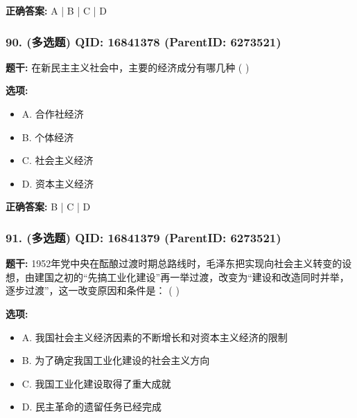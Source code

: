 \documentclass[12pt,UTF8]{ctexart}
\begin{document}
\textbf{正确答案:}
A | B | C | D

\vspace{0.3em}\hrulefill\vspace{0.7em}

\subsubsection*{90. (多选题) \small QID: 16841378 (ParentID: 6273521)}

\textbf{题干:}
在新民主主义社会中，主要的经济成分有哪几种 ( )



\textbf{选项:}
\begin{itemize}[leftmargin=*]

  \item A. 合作社经济

  \item B. 个体经济

  \item C. 社会主义经济

  \item D. 资本主义经济

\end{itemize}

\textbf{正确答案:}
B | C | D

\vspace{0.3em}\hrulefill\vspace{0.7em}

\subsubsection*{91. (多选题) \small QID: 16841379 (ParentID: 6273521)}

\textbf{题干:}
1952年党中央在酝酿过渡时期总路线时，毛泽东把实现向社会主义转变的设想，由建国之初的“先搞工业化建设”再一举过渡，改变为“建设和改造同时并举，逐步过渡”，这一改变原因和条件是： ( )



\textbf{选项:}
\begin{itemize}[leftmargin=*]

  \item A. 我国社会主义经济因素的不断增长和对资本主义经济的限制

  \item B. 为了确定我国工业化建设的社会主义方向

  \item C. 我国工业化建设取得了重大成就

  \item D. 民主革命的遗留任务已经完成

\end{itemize}
\end{document}
